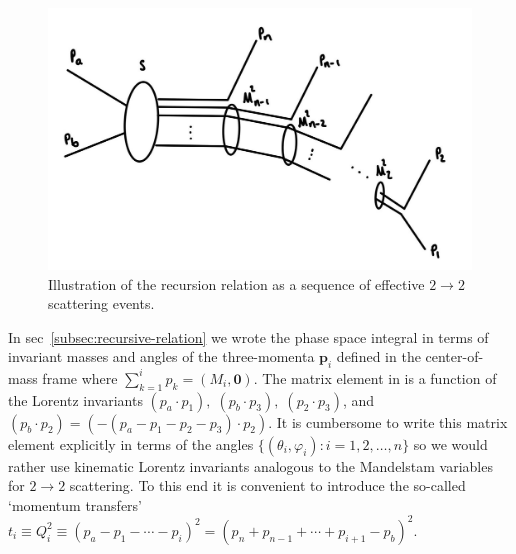 \begin{figure}[t]
    \centering
    \includegraphics[width=0.6\linewidth]{figs/recursion-diagram.jpg}
    \caption{Illustration of the recursion relation as a sequence of effective $2 \rightarrow 2$ scattering events.}
    \label{fig:recursion-diagram}
\end{figure}

\label{subsec:momentum-transfers}

In sec~\ref{subsec:recursive-relation} we wrote the phase space integral in terms of invariant masses and angles of the three-momenta $\bm{p}_i$ defined in the center-of-mass frame where $\sum_{k=1}^{i} p_k = (M_{i}, \bm{0})$. 
The matrix element in  is a function of the Lorentz invariants $(p_a \cdot p_1), \; (p_b \cdot p_3), \; (p_2 \cdot p_3)$, and $(p_b \cdot p_2) = (- (p_a - p_1 - p_2 - p_3) \cdot p_2)$. 
It is cumbersome to write this matrix element explicitly in terms of the angles $\{ (\theta_i, \varphi_i) : i = 1, 2, \ldots, n\}$ so we would rather use kinematic Lorentz invariants analogous to the Mandelstam variables for $2 \rightarrow 2$ scattering\footnotemark.
To this end it is convenient to introduce the so-called `momentum transfers' $t_i \equiv Q_i^2 \equiv (p_a - p_1 - \cdots - p_i)^2 = (p_n + p_{n-1} + \cdots + p_{i + 1} - p_b)^2$.


